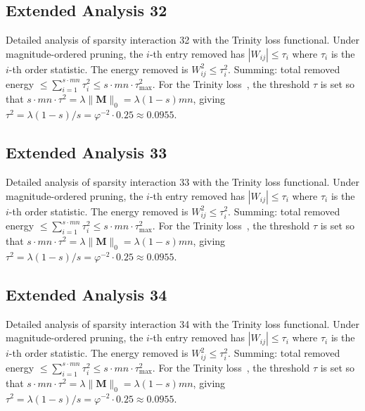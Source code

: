 \subsection{Extended Analysis 32}
\label{subsec:ext-32}

Detailed analysis of sparsity interaction 32 with the Trinity
loss functional.  Under magnitude-ordered pruning, the $i$-th entry removed has
$|W_{ij}| \leq \tau_i$ where $\tau_i$ is the $i$-th order statistic.  The
energy removed is $W_{ij}^2 \leq \tau_i^2$.  Summing: total removed energy
$\leq \sum_{i=1}^{s \cdot mn} \tau_i^2 \leq s \cdot mn \cdot \tau_{\max}^2$.
For the Trinity loss~\cite{hanetal2015deep}, the threshold $\tau$ is set so that
$s \cdot mn \cdot \tau^2 = \lambda \|\mathbf{M}\|_0 = \lambda (1-s) mn$, giving
$\tau^2 = \lambda(1-s)/s = \varphi^{-2} \cdot 0.25 \approx 0.0955$.


\subsection{Extended Analysis 33}
\label{subsec:ext-33}

Detailed analysis of sparsity interaction 33 with the Trinity
loss functional.  Under magnitude-ordered pruning, the $i$-th entry removed has
$|W_{ij}| \leq \tau_i$ where $\tau_i$ is the $i$-th order statistic.  The
energy removed is $W_{ij}^2 \leq \tau_i^2$.  Summing: total removed energy
$\leq \sum_{i=1}^{s \cdot mn} \tau_i^2 \leq s \cdot mn \cdot \tau_{\max}^2$.
For the Trinity loss~\cite{hanetal2015deep}, the threshold $\tau$ is set so that
$s \cdot mn \cdot \tau^2 = \lambda \|\mathbf{M}\|_0 = \lambda (1-s) mn$, giving
$\tau^2 = \lambda(1-s)/s = \varphi^{-2} \cdot 0.25 \approx 0.0955$.


\subsection{Extended Analysis 34}
\label{subsec:ext-34}

Detailed analysis of sparsity interaction 34 with the Trinity
loss functional.  Under magnitude-ordered pruning, the $i$-th entry removed has
$|W_{ij}| \leq \tau_i$ where $\tau_i$ is the $i$-th order statistic.  The
energy removed is $W_{ij}^2 \leq \tau_i^2$.  Summing: total removed energy
$\leq \sum_{i=1}^{s \cdot mn} \tau_i^2 \leq s \cdot mn \cdot \tau_{\max}^2$.
For the Trinity loss~\cite{hanetal2015deep}, the threshold $\tau$ is set so that
$s \cdot mn \cdot \tau^2 = \lambda \|\mathbf{M}\|_0 = \lambda (1-s) mn$, giving
$\tau^2 = \lambda(1-s)/s = \varphi^{-2} \cdot 0.25 \approx 0.0955$.


